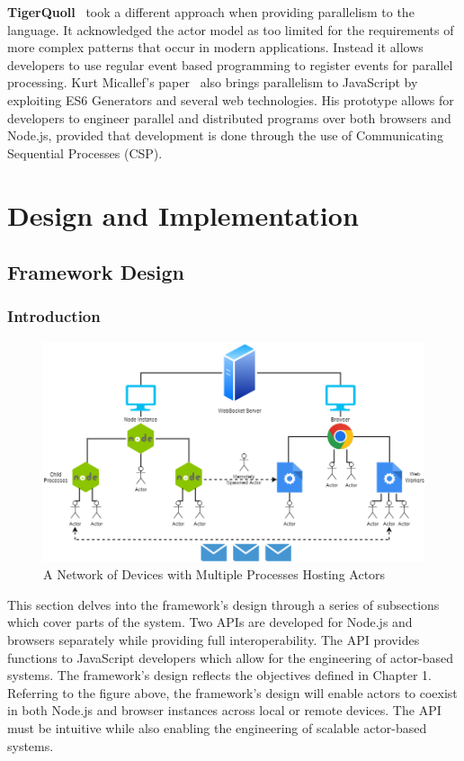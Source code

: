 \documentclass[oneside]{um-fict}
\begin{document}
\textbf{TigerQuoll}~\cite{tigerquoll} took a different approach when providing parallelism to the language. It acknowledged the actor model as too limited for the requirements of more complex patterns that occur in modern applications. Instead it allows developers to use regular event based programming to register events for parallel processing. Kurt Micallef's paper~\cite{kurt} also brings parallelism to JavaScript by exploiting ES6 Generators and several web technologies. His prototype allows for developers to engineer parallel and distributed programs over both browsers and Node.js, provided that development is done through the use of Communicating Sequential Processes (CSP).

\chapter{Design and Implementation}\label{chap:design}
\section{Framework Design}
\subsection{Introduction}
\begin{figure}[H]
    \begin{centering}
        \includegraphics[width=\textwidth]{resources/network.png}
        \caption{A Network of Devices with Multiple Processes Hosting Actors}
    \end{centering}\label{fig:network}
\end{figure}
This section delves into the framework's design through a series of subsections which cover parts of the system. Two APIs are developed for Node.js and browsers separately while providing full interoperability. The API provides functions to JavaScript developers which allow for the engineering of actor-based systems. The framework's design reflects the objectives defined in Chapter 1. Referring to the figure above, the framework's design will enable actors to coexist in both Node.js and browser instances across local or remote devices. The API must be intuitive while also enabling the engineering of scalable actor-based systems.
\end{document}
